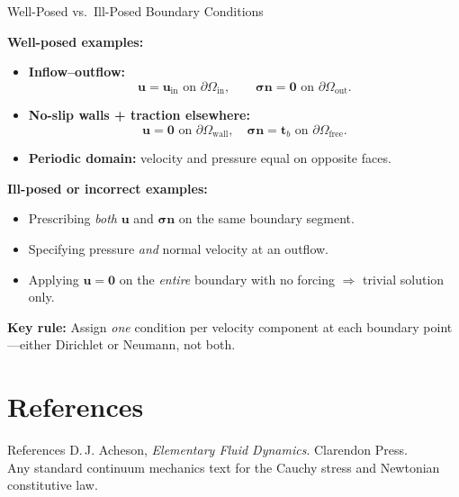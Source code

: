 \documentclass[aspectratio=169]{beamer}
\begin{document}
\begin{frame}{Well-Posed vs.\ Ill-Posed Boundary Conditions}

\textbf{Well-posed examples:}
\footnotesize
\begin{itemize}
  \item \textbf{Inflow–outflow:}
  \[
    \mathbf{u} = \mathbf{u}_{\text{in}} \text{ on } \partial\Omega_{\text{in}}, 
    \qquad
    \boldsymbol{\sigma}\mathbf{n} = \mathbf{0} \text{ on } \partial\Omega_{\text{out}}.
  \]
  \item \textbf{No-slip walls + traction elsewhere:}
  \[
    \mathbf{u} = \mathbf{0} \text{ on } \partial\Omega_{\text{wall}}, \quad
    \boldsymbol{\sigma}\mathbf{n} = \mathbf{t}_b \text{ on } \partial\Omega_{\text{free}}.
  \]
  \item \textbf{Periodic domain:}
  velocity and pressure equal on opposite faces.
\end{itemize}

\medskip

\textbf{Ill-posed or incorrect examples:}
\begin{itemize}
  \item Prescribing \emph{both} $\mathbf{u}$ and $\boldsymbol{\sigma}\mathbf{n}$ on the same boundary segment.
  \item Specifying pressure \emph{and} normal velocity at an outflow.
  \item Applying $\mathbf{u}=\mathbf{0}$ on the \emph{entire} boundary with no forcing
        $\Rightarrow$ trivial solution only.
\end{itemize}

\medskip

\textbf{Key rule:}  
Assign \emph{one} condition per velocity component at each boundary point—either Dirichlet or Neumann, not both.

\end{frame}



\section{References}
\begin{frame}{References}
D.\,J. Acheson, \textit{Elementary Fluid Dynamics}. Clarendon Press.\\[4pt]
Any standard continuum mechanics text for the Cauchy stress and Newtonian constitutive law.
\end{frame}
\end{document}
